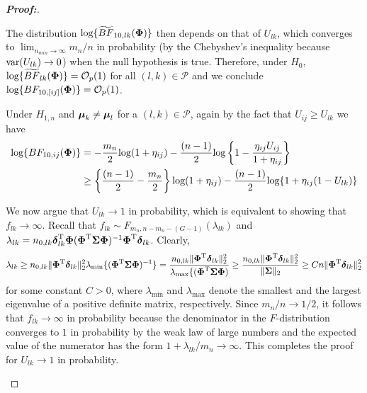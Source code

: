 \documentclass[APA,Times1COL]{WileyNJDv5} %
\def\log{\hbox{log}}
\def\var{\hbox{var}}
\def\log{\hbox{log}}
\def\var{\hbox{var}}
\def\be{\begin{eqnarray}}
\def\ee{\end{eqnarray}}
\def\trans{^{\rm T}}
\newcommand{\bSigma}{\mbox{\boldmath $\Sigma$}}
\newcommand{\udelta}            {\mbox{\boldmath$\delta$}}
\newcommand{\umu}               {\mbox{\boldmath$\mu$}}
\newcommand{\uPhi}              {\mbox{\boldmath$\Phi$}}
\begin{document}
\begin{proof}[\textbf{\upshape Proof:}]
\begin{description}
The distribution $ \log\{\widetilde{BF}_{10, lk}(\uPhi) \}$ then depends on that of $U_{lk}$, which
converges to $\lim_{n_{min}\to\infty}m_n/n$ in probability (by the Chebyshev's inequality because $\var(U_{lk})\to 0$)
when the null hypothesis is true.
Therefore, under $H_0$, $\log\{\widetilde{BF}_{lk}(\uPhi) \} = \mathcal{O}_{p}(1)$ for all $(l, k)\in\mathcal{P}$ and we conclude $\log\{BF_{10,[ij]}(\uPhi) \} = \mathcal{O}_{p}(1)$.

Under $H_{1,n}$ and $\umu_{k} \neq \umu_{l}$ for a $(l, k) \in \mathcal{P}$, again 
by the fact that $U_{ij}\geq U_{lk}$ 
we have
\begin{align*}
    \log\{BF_{10,ij}(\uPhi) \} &= -\frac{m_n}{2}\log(1 + \eta_{ij}) - \frac{(n-1)}{2}\log\left\{ 1 - \frac{\eta_{ij} U_{ij}}{1 + \eta_{ij}} \right\}\\
    & \geq \left\{\frac{(n - 1)}{2} - \frac{m_n}{2}\right\}\log(1 + \eta_{ij}) - \frac{(n - 1)}{2}\log\{1 + \eta_{ij}(1 - U_{lk})\}
\end{align*}
{\color{black}
We now argue that $U_{lk}\to 1$ in probability, which is equivalent to showing that $f_{lk}\to\infty$. Recall that $f_{lk}\sim F_{m_n, n - m_n - (G - 1)}(\lambda_{lk})$ and $\lambda_{lk} = n_{0,lk}\udelta_{lk}\trans\uPhi(\uPhi\trans\bSigma\uPhi)^{-1}\uPhi\trans\udelta_{lk}$. Clearly,
\[
\lambda_{lk} \geq n_{0,lk}\|\uPhi\trans\udelta_{lk}\|_2^2\lambda_{\min}\{(\uPhi\trans\bSigma\uPhi)^{-1}\}
= \frac{n_{0,lk}\|\uPhi\trans\udelta_{lk}\|_2^2}{\lambda_{\max}\{(\uPhi\trans\bSigma\uPhi)}\geq \frac{n_{0,lk}\|\uPhi\trans\udelta_{lk}\|_2^2}{\|\bSigma\|_2} \geq Cn\|\uPhi\trans\udelta_{lk}\|_2^2 
\]
for some constant $C > 0$, where $\lambda_{\min}$ and $\lambda_{\max}$ denote the smallest and the largest eigenvalue of a positive definite matrix, respectively. 
Since $m_n/n\to 1/2$, it follows that $f_{lk}\to \infty$ in probability because the denominator in the $F$-distribution converges to $1$ in probability by the weak law of large numbers and the expected value of the numerator has the form $1 + \lambda_{lk}/m_n\to\infty$. This completes the proof for $U_{lk}\to 1$ in probability. 

}
\end{description}
\end{proof}
\end{document}
